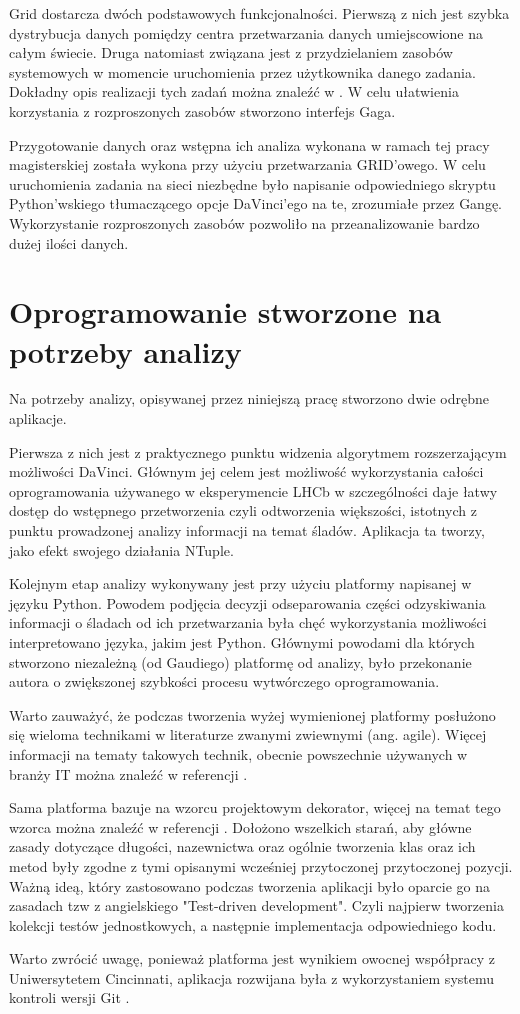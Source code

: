 Grid dostarcza dwóch podstawowych funkcjonalności. Pierwszą z nich jest szybka dystrybucja danych pomiędzy centra przetwarzania danych umiejscowione na całym świecie. Druga natomiast związana jest z przydzielaniem zasobów systemowych w momencie uruchomienia przez użytkownika danego zadania. Dokładny opis realizacji tych zadań można znaleźć w \cite{Grid}.  W celu ułatwienia korzystania z rozproszonych zasobów stworzono interfejs Gaga\citep{Ganga}.

Przygotowanie danych oraz wstępna ich  analiza wykonana w ramach tej pracy magisterskiej została wykona przy użyciu przetwarzania GRID'owego. W celu uruchomienia zadania na sieci niezbędne było napisanie odpowiedniego skryptu Python'wskiego tłumaczącego opcje DaVinci'ego na te, zrozumiałe przez Gangę. Wykorzystanie rozproszonych zasobów pozwoliło na  przeanalizowanie bardzo dużej ilości danych. 

\section{Oprogramowanie stworzone na potrzeby analizy}

Na potrzeby analizy, opisywanej przez niniejszą pracę stworzono dwie odrębne aplikacje. 

Pierwsza z nich jest z praktycznego punktu widzenia algorytmem rozszerzającym możliwości DaVinci. Głównym jej celem jest możliwość wykorzystania całości oprogramowania używanego w eksperymencie LHCb w szczególności daje łatwy dostęp do wstępnego przetworzenia czyli odtworzenia większości, istotnych z punktu prowadzonej analizy informacji na temat śladów. Aplikacja ta tworzy, jako efekt swojego działania NTuple.

Kolejnym etap analizy wykonywany jest przy użyciu platformy napisanej w języku Python. Powodem podjęcia decyzji odseparowania części odzyskiwania informacji o śladach od ich przetwarzania była chęć wykorzystania możliwości interpretowano języka, jakim jest Python. Głównymi powodami dla których stworzono niezależną (od Gaudiego) platformę od analizy, było przekonanie autora o zwiększonej szybkości  procesu wytwórczego oprogramowania.

Warto zauważyć, że podczas tworzenia wyżej wymienionej platformy posłużono się wieloma technikami w literaturze zwanymi zwiewnymi (ang. agile). Więcej informacji na tematy takowych technik, obecnie powszechnie używanych w branży IT można znaleźć w referencji \cite{Bob}.   

Sama platforma bazuje na wzorcu projektowym dekorator, więcej na temat tego wzorca można znaleźć w referencji \cite{designPatterns}. Dołożono wszelkich starań, aby główne zasady dotyczące długości, nazewnictwa oraz ogólnie tworzenia klas oraz ich metod były zgodne z tymi opisanymi wcześniej przytoczonej przytoczonej pozycji. Ważną ideą, który zastosowano podczas tworzenia aplikacji było oparcie go na zasadach tzw z angielskiego "Test-driven development". Czyli najpierw tworzenia kolekcji testów jednostkowych, a następnie implementacja odpowiedniego kodu. 

Warto zwrócić uwagę, ponieważ platforma jest wynikiem owocnej współpracy z Uniwersytetem Cincinnati, aplikacja rozwijana była z wykorzystaniem systemu kontroli wersji Git \cite{Git}.  